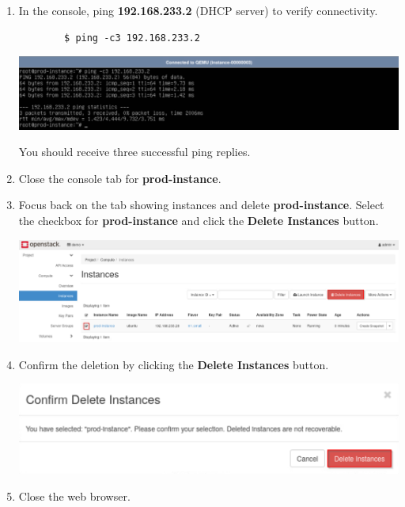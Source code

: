 \documentclass[letterpaper, 12pt]{article}
\begin{document}
\begin{enumerate}
    \item In the console, ping \textbf{192.168.233.2} (DHCP server) to verify connectivity.
    \begin{lstlisting}
        $ ping -c3 192.168.233.2
    \end{lstlisting}

    \begin{center}
        \includegraphics[width=\linewidth]{images/part1/step14.png}
    \end{center}

    \begin{notebox}
        You should receive three successful ping replies.
    \end{notebox}

    \item Close the console tab for \textbf{prod-instance}.

    \item Focus back on the tab showing instances and delete \textbf{prod-instance}. Select the checkbox for \textbf{prod-instance} and click the \textbf{Delete Instances} button.

    \begin{center}
        \includegraphics[width=\linewidth]{images/part1/step16.png}
    \end{center}

    \item Confirm the deletion by clicking the \textbf{Delete Instances} button.

    \begin{center}
        \includegraphics[width=\linewidth]{images/part1/step17.png}
    \end{center}

    \item Close the web browser.
\end{enumerate}
\end{document}
